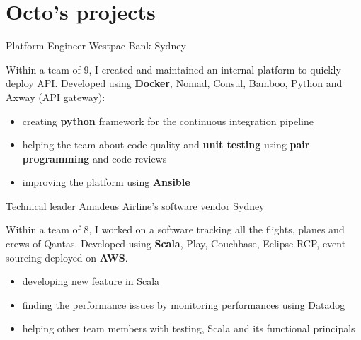 \documentclass[11pt,a4paper]{moderncv}
\begin{document}
\section{Octo's projects}

{Platform Engineer}
{Westpac}
{Bank}
{Sydney}
{
Within a team of 9, I created and maintained an internal platform to quickly deploy API. Developed using \textbf{Docker}, Nomad, Consul, Bamboo, Python and Axway (API gateway):
\begin{itemize}
\item creating \textbf{python} framework for the continuous integration pipeline
\item helping the team about code quality and \textbf{unit testing} using \textbf{pair programming} and code reviews
\item improving the platform using \textbf{Ansible}
\end{itemize}
\vspace{5mm}
}

{Technical leader}
{Amadeus}
{Airline's software vendor}
{Sydney}
{
Within a team of 8, I worked on a software tracking all the flights, planes and crews of Qantas. Developed using \textbf{Scala}, Play, Couchbase, Eclipse RCP, event sourcing deployed on \textbf{AWS}.
\begin{itemize}
\item developing new feature in Scala
\item finding the performance issues by monitoring performances using Datadog
\item helping other team members with testing, Scala and its functional principals
\end{itemize}
\vspace{5mm}
}
\end{document}
